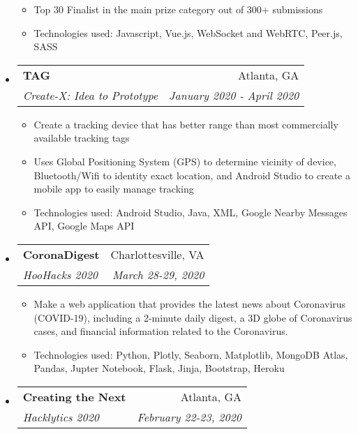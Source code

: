 \documentclass[letterpaper,11pt]{article}
\makeatletter
\newcommand{\resitem}[1]{\item #1 \vspace{-2pt}}
\newcommand{\ressubheading}[4]{
\begin{tabular*}{7.0in}{l@{\extracolsep{\fill}}r}
		\textbf{#1} & #2 \\
		\textit{#3} & \textit{#4} \\
\end{tabular*}\vspace{-6pt}}
\makeatother
\begin{document}
\begin{itemize}
\begin{itemize}
        \resitem{Top 30 Finalist in the main prize category out of 300+ submissions}
        \resitem{Technologies used: Javascript, Vue.js, WebSocket and WebRTC, Peer.js, SASS}
    \end{itemize}
\item
    \ressubheading{TAG}{Atlanta, GA}{Create-X: Idea to Prototype}{January 2020 - April 2020}
    \begin{itemize}
        \item Create a tracking device that has better range than most commercially available tracking tags
        \item Uses Global Positioning System (GPS) to determine vicinity of device, Bluetooth/Wifi to identity exact location, and Android Studio to create a mobile app to easily manage tracking
        \item Technologies used: Android Studio, Java, XML, Google Nearby Messages API, Google Maps API
    \end{itemize}
\item
    \ressubheading{CoronaDigest}{Charlottesville, VA}{HooHacks 2020}{March 28-29, 2020}
    \begin{itemize}
        \resitem{Make a web application that provides the latest news about Coronavirus (COVID-19), including a 2-minute daily digest, a 3D globe of Coronavirus cases, and financial information related to the Coronavirus.}
        \resitem{Technologies used: Python, Plotly, Seaborn, Matplotlib, MongoDB Atlas, Pandas, Jupter Notebook, Flask, Jinja, Bootstrap, Heroku}
    \end{itemize}
\item
    \ressubheading{Creating the Next}{Atlanta, GA}{Hacklytics 2020}{February 22-23, 2020}
    \begin{itemize}

\end{itemize}
\end{itemize}
\end{document}
